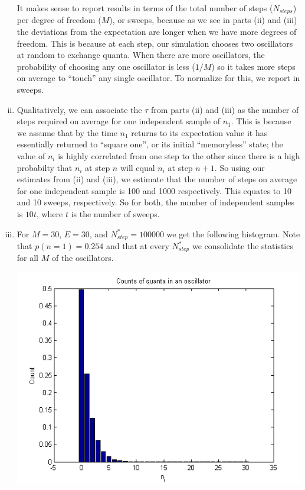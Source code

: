 \documentclass{article}
\begin{document}
\begin{enumerate}[i.]
    It makes sense to report results in terms of the total number of steps ($N_{steps}$) per degree of freedom ($M$), or sweeps, because as we see in parts (ii) and (iii) the deviations from the expectation are longer when we have more degrees of freedom. This is because at each step, our simulation chooses two oscillators at random to exchange quanta. When there are more oscillators, the probability of choosing any one oscillator is less ($1/M$) so it takes more steps on average to ``touch'' any single oscillator. To normalize for this, we report in sweeps.

  \item Qualitatively, we can associate the $\tau$ from parts (ii) and (iii) as the number of steps required on average for one independent sample of $n_1$. This is because we assume that by the time $n_1$ returns to its expectation value it has essentially returned to ``square one'', or its initial ``memoryless'' state; the value of $n_i$ is highly correlated from one step to the other since there is a high probabilty that $n_i$ at step $n$ will equal $n_i$ at step $n+1$.
    So using our estimates from (ii) and (iii), we estimate that the number of steps on average for one independent sample is 100 and 1000 respectively. This equates to 10 and 10 sweeps, respectively. So for both, the number of independent samples is $10t$, where $t$ is the number of sweeps.

  \item For $M=30$, $E=30$, and $N^*_{step}=100000$ we get the following histogram. Note that $p(n=1)=0.254$ and that at every $N^*_{step}$  we consolidate the statistics for all $M$ of the oscillators.
    \begin{center}
      \includegraphics[scale=0.5]{prob2part5}
    \end{center}


\end{enumerate}
\end{document}
